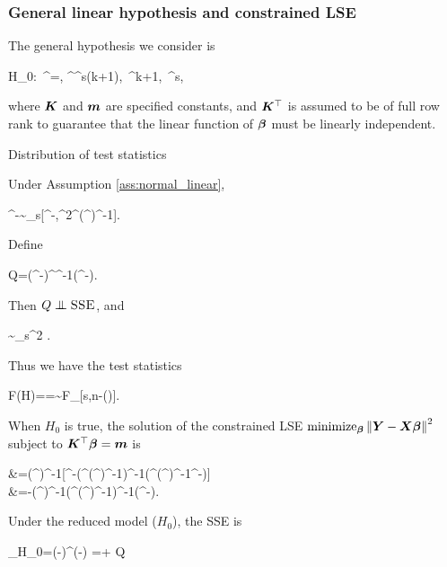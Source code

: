 \documentclass[10pt,a4paper]{book}
\begin{document}
\subsubsection{General linear hypothesis and constrained LSE}\label{sec:LR_full_rank_normal_general_linear_hypo}
The general hypothesis we consider is
\begin{sequation*}
	H_0:\ \K^\TT \bab=\m, \quad \K^\TT\in\bbR^{s\times (k+1)},\ \bab\in\bbR^{k+1},\ \m\in\bbR^s,
\end{sequation*}
where ${\boldsymbol K}$ and ${\boldsymbol m}$ are specified constants, and ${\boldsymbol K}^\top$ is assumed to be of full row rank to guarantee that the linear function of ${\boldsymbol\beta}$ must be linearly independent.
\begin{thmbox}{Distribution of test statistics}
	\begin{proposition}\label{prop:LR_full_rank_normal_general_linear_hypo}
		Under Assumption \ref{ass:normal_linear}, 
		\begin{sequation*}
			\K^\TT\hat{\bab}-\m\sim\rmN_s[\K^\TT\bab-\m,\sigma^2\K^\TT(\X^\TT\X)^{-1}\K].
		\end{sequation*}
		Define 
		\begin{sequation*}
			Q=(\K^\TT\hat{\bab}-\m)^\TT [\K^\TT(\X^\TT\X)^{-1}\K]^{-1}(\K^\TT\hat{\bab}-\m).
		\end{sequation*}
		Then $Q\indep\SSE$, and 
		\begin{sequation*}
			\sim\chi_{s}^2 \cbk{\sigma^{-2}(\K^\TT{\bab}-\m)^\TT [\K^\TT(\X^\TT\X)^{-1}\K]^{-1}(\K^\TT{\bab}-\m)}.
		\end{sequation*}
		Thus we have the test statistics 
		\begin{sequation*}
			F(H)==\sim\textsc{F}_{[s,n-\rmr(\X)]}\cbk{\sigma^{-2}(\K^\TT{\bab}-\m)^\TT [\K^\TT(\X^\TT\X)^{-1}\K]^{-1}(\K^\TT{\bab}-\m)}.
		\end{sequation*}
	\end{proposition}
\end{thmbox}
When $H_0$ is true, the solution of the constrained LSE $\mathrm{minimize}_{{\boldsymbol\beta}}\left\lVert{\boldsymbol Y}-{\boldsymbol X}{\boldsymbol\beta}\right\rVert^2$ subject to ${\boldsymbol K}^\top{\boldsymbol\beta}={\boldsymbol m}$ is 
\begin{salign*}
	\tilde{\bab}&=(\X^\top \X)^{-1}[\X^\top \Y-\K(\K^\top(\X^\top \X)^{-1}\K)^{-1}(\K^\top(\X^\top \X)^{-1}\X^\top \Y-\m)]\\
	&=\hat{\bab}-(\X^\top \X)^{-1}\K(\K^\top(\X^\top \X)^{-1}\K)^{-1}(\K^\top\hat{\bab}-\m).
\end{salign*}   
Under the reduced model ($H_0$), the SSE is 
\begin{salign*}
	\SSE_{H_0}=(\Y-\X\tilde{\bab})^\TT (\Y-\X\tilde{\bab}) 
	=\SSE + Q
\end{salign*}
\end{document}
